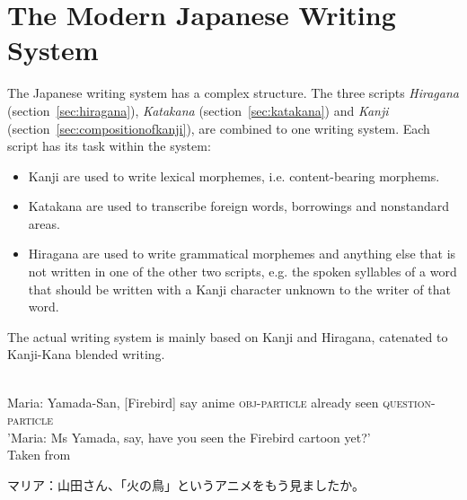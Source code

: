 \section{The Modern Japanese Writing System}
\label{sec:modernjapanesewritingsystem}


The Japanese writing system has a complex structure. The three scripts 
\emph{Hiragana} (section~\ref{sec:hiragana}),
\emph{Katakana} (section~\ref{sec:katakana}) and
\emph{Kanji} (section~\ref{sec:compositionofkanji}),
are combined to one writing system. Each script has its task within the system:
\begin{itemize}

  \item Kanji are used to write lexical morphemes, i.e. content-bearing morphems.

  \item Katakana are used to transcribe foreign words, borrowings and 
        nonstandard areas.

  \item Hiragana are used to write grammatical morphemes and anything else that
        is not written in one of the other two scripts, e.g. the spoken syllables
        of a word that should be written with a Kanji character unknown to the 
        writer of that word.
\end{itemize}
The actual writing system is mainly based on Kanji and Hiragana, catenated to
Kanji-Kana blended writing.
\begin{exe}
\ex\label{exe:mariaYamada}
\begin{xlist}
\ex \label{exe:mariaYamadaSplit}
\gll 
  \\
 Maria: Yamada-San, [Firebird] say anime \textsc{obj-particle} already seen \textsc{question-particle} \\
\trans 'Maria: Ms Yamada, say, have you seen the Firebird cartoon yet?' \\
Taken from~
\ex\label{exe:mariaYamadaFull}
 \begin{CJK} 
  マリア：山田さん、「火の鳥」というアニメをもう見ましたか。
 \end{CJK}
\end{xlist}
\end{exe}
